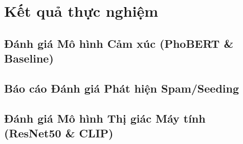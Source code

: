 \section{Kết quả thực nghiệm}

\subsection{Đánh giá Mô hình Cảm xúc (PhoBERT \& Baseline)}

\subsection{Báo cáo Đánh giá Phát hiện Spam/Seeding}

\subsection{Đánh giá Mô hình Thị giác Máy tính (ResNet50 \& CLIP)}

\clearpage
